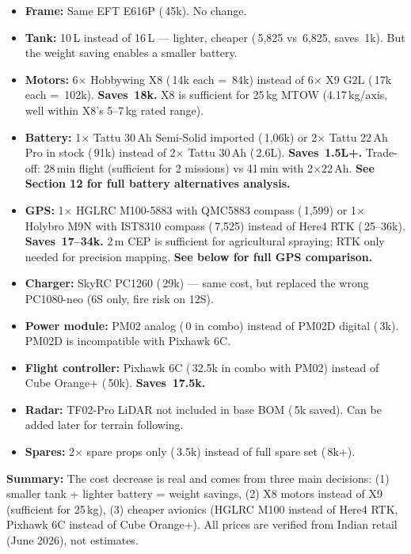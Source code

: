 \documentclass[11pt,a4paper]{article}
\newcommand{\Rs}{\rupee\,}
\begin{document}
\begin{itemize}
  \item \textbf{Frame:} Same EFT E616P (\Rs{}45k). No change.
  \item \textbf{Tank:} 10\,L instead of 16\,L --- lighter, cheaper (\Rs{}5,825 vs \Rs{}6,825, saves \Rs{}1k). But the weight saving enables a smaller battery.
  \item \textbf{Motors:} 6$\times$ Hobbywing X8 (\Rs{}14k each = \Rs{}84k) instead of 6$\times$ X9 G2L (\Rs{}17k each = \Rs{}102k). \textbf{Saves \Rs{}18k.} X8 is sufficient for 25\,kg MTOW (4.17\,kg/axis, well within X8's 5--7\,kg rated range).
  \item \textbf{Battery:} 1$\times$ Tattu 30\,Ah Semi-Solid imported (\Rs{}1,06k) or 2$\times$ Tattu 22\,Ah Pro in stock (\Rs{}91k) instead of 2$\times$ Tattu 30\,Ah (\Rs{}2.6L). \textbf{Saves \Rs{}1.5L+.} Trade-off: 28\,min flight (sufficient for 2 missions) vs 41\,min with 2$\times$22\,Ah. \textbf{See Section 12 for full battery alternatives analysis.}
  \item \textbf{GPS:} 1$\times$ HGLRC M100-5883 with QMC5883 compass (\Rs{}1,599) or 1$\times$ Holybro M9N with IST8310 compass (\Rs{}7,525) instead of Here4 RTK (\Rs{}25--36k). \textbf{Saves \Rs{}17--34k.} 2\,m CEP is sufficient for agricultural spraying; RTK only needed for precision mapping. \textbf{See below for full GPS comparison.}
  \item \textbf{Charger:} SkyRC PC1260 (\Rs{}29k) --- same cost, but replaced the wrong PC1080-neo (6S only, fire risk on 12S).
  \item \textbf{Power module:} PM02 analog (\Rs{}0 in combo) instead of PM02D digital (\Rs{}3k). PM02D is incompatible with Pixhawk 6C.
  \item \textbf{Flight controller:} Pixhawk 6C (\Rs{}32.5k in combo with PM02) instead of Cube Orange+ (\Rs{}50k). \textbf{Saves \Rs{}17.5k.}
  \item \textbf{Radar:} TF02-Pro LiDAR not included in base BOM (\Rs{}5k saved). Can be added later for terrain following.
  \item \textbf{Spares:} 2$\times$ spare props only (\Rs{}3.5k) instead of full spare set (\Rs{}8k+).
\end{itemize}

\noindent\textbf{Summary:} The cost decrease is real and comes from three main decisions: (1) smaller tank + lighter battery = weight savings, (2) X8 motors instead of X9 (sufficient for 25\,kg), (3) cheaper avionics (HGLRC M100 instead of Here4 RTK, Pixhawk 6C instead of Cube Orange+). All prices are verified from Indian retail (June 2026), not estimates.
\end{document}
